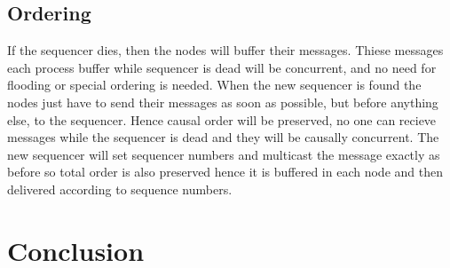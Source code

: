 \documentclass{article}
\begin{document}
  \subsection{Ordering}
    If the sequencer dies, then the nodes will buffer their messages. Thiese messages 
    each process buffer while sequencer is dead will be concurrent, and no need for flooding or special
    ordering is needed. When the new sequencer is found the nodes just have to send their messages as soon
    as possible, but before anything else, to the sequencer. Hence causal order will be preserved, no one
    can recieve messages while the sequencer is dead and they will be causally concurrent. The new sequencer
    will set sequencer numbers and multicast the message exactly as before so total order is also preserved
    hence it is buffered in each node and then delivered according to sequence numbers.
    
\section{Conclusion}
\end{document}

